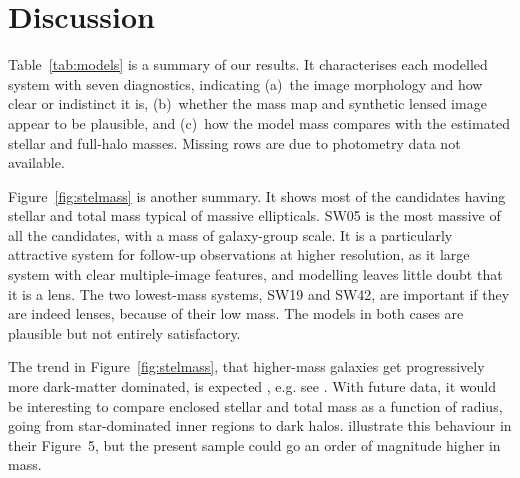 \section{Discussion}\label{sec:summary}

Table~\ref{tab:models} is a summary of our results.  It characterises
each modelled system with seven diagnostics, indicating (a)~the image
morphology and how clear or indistinct it is, (b)~whether the mass map
and synthetic lensed image appear to be plausible, and (c)~how the
model mass compares with the estimated stellar and full-halo masses.
Missing rows are due to photometry data not available.

Figure~\ref{fig:stelmass} is another summary.  It shows most of the
candidates having stellar and total mass typical of massive
ellipticals.  SW05 is the most massive of all the candidates, with a
mass of galaxy-group scale.  It is a particularly attractive system
for follow-up observations at higher resolution, as it large system
with clear multiple-image features, and modelling leaves little doubt
that it is a lens.  The two lowest-mass systems, SW19 and SW42, are
important if they are indeed lenses, because of their low mass.  The
models in both cases are plausible but not entirely satisfactory.

The trend in Figure~\ref{fig:stelmass}, that higher-mass galaxies get
progressively more dark-matter dominated, is expected
, e.g. see \cite{} %
.  With future data, it would be interesting to compare enclosed
stellar and total mass as a function of radius, going from
star-dominated inner regions to dark halos.
\cite{2011ApJ...740...97L} illustrate this behaviour in their
Figure~5, but the present sample could go an order of magnitude higher
in mass.


